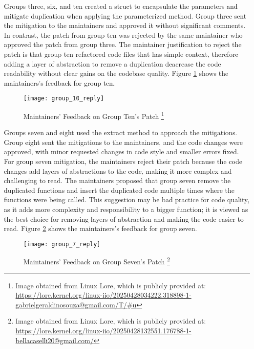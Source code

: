 Groups three, six, and ten created a struct to encapsulate the parameters and mitigate duplication 
when applying the parameterized method. Group three sent the mitigation to the maintainers and 
approved it without significant comments. In contrast, the patch from group ten was rejected by 
the same maintainer who approved the patch from group three. The maintainer justification to reject 
the patch is that group ten refactored code files that has simple context, therefore adding a layer 
of abstraction to remove a duplication deacrease the code readability without clear gains on 
the codebase quality. Figure \ref{fig:group_10_reply} shows the maintainers's feedback for group ten.


\begin{figure}
\texttt{[image: group\_10\_reply]}
\caption[Maintainers' Feedback on Group Ten's Patch]{
Maintainers' Feedback on Group Ten's Patch
\footnote{Image obtained from Linux Lore, which is publicly provided at:
\url{https://lore.kernel.org/linux-iio/20250428034222.318898-1-gabrielgeraldinosouza@gmail.com/T/\#u}}
}
\label{fig:group_10_reply}
\end{figure}

Groups seven and eight used the extract method to approach the mitigations. Group eight sent the 
mitigations to the maintainers, and the code changes were approved, with minor requested changes 
in code style and smaller errors fixed. For group seven mitigation, the maintainers reject their 
patch because the code changes add layers of abstractions to the code, making it more complex and 
challenging to read. The maintainers proposed that group seven remove the duplicated functions and 
insert the duplicated code multiple times where the functions were being called. This suggestion 
may be bad practice for code quality, as it adds more complexity and responsibility to a bigger 
function; it is viewed as the best choice for removing layers of abstraction and making the 
code easier to read. Figure \ref{fig:group_7_reply} shows the maintainers's feedback for group seven.


\begin{figure}
\texttt{[image: group\_7\_reply]}
\caption[Maintainers' Feedback on Group Seven's Patch]{
Maintainers' Feedback on Group Seven's Patch
\footnote{Image obtained from Linux Lore, which is publicly provided at:
\url{https://lore.kernel.org/linux-iio/20250428132551.176788-1-bellacaselli20@gmail.com/}}
}
\label{fig:group_7_reply}
\end{figure}


